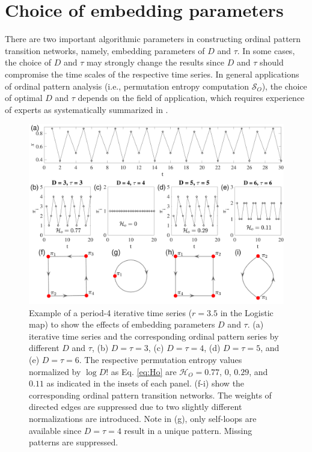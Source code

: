\documentclass[12pt,aip,cha,reprint,nofootinbib]{revtex4-1}
\begin{document}
\section{Choice of embedding parameters} \label{sec:embeddings}
There are two important algorithmic parameters in constructing ordinal pattern transition networks, namely, embedding parameters of $D$ and $\tau$. In some cases, the choice of $D$ and $\tau$ may strongly change the results since $D$ and $\tau$ should compromise the time scales of the respective time series. In general applications of ordinal pattern analysis (i.e., permutation entropy computation $\mathcal{S}_O$), the choice of optimal $D$ and $\tau$ depends on the field of application, which requires experience of experts as systematically summarized in \cite{Riedl2013}.
\begin{figure}
	\centering 
	\includegraphics[width=2\columnwidth]{period4_logisticExample.pdf}
\caption{\small{Example of a period-4 iterative time series ($r= 3.5$ in the Logistic map) to show the effects of embedding parameters $D$ and $\tau$. (a) iterative time series and the corresponding ordinal pattern series by different $D$ and $\tau$, (b) $D = \tau = 3$, (c) $D = \tau = 4$, (d) $D = \tau = 5$, and (e) $D = \tau = 6$. The respective permutation entropy values normalized by $\log D!$ as Eq. \eqref{eq:Ho} are $\mathcal{H}_O = 0.77$, $0$, $0.29$, and $0.11$ as indicated in the insets of each panel. (f-i) show the corresponding ordinal pattern transition networks. The weights of directed edges are suppressed due to two slightly different normalizations are introduced. Note in (g), only self-loops are available since $D = \tau = 4$ result in a unique pattern. Missing patterns are suppressed. }
\label{fig:embed}}
\end{figure}
\end{document}
